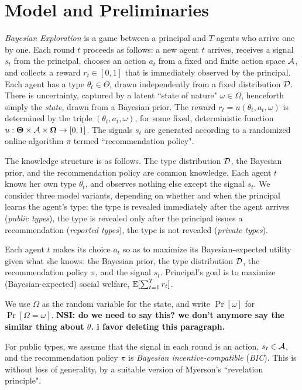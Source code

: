 \section{Model and Preliminaries}

\emph{Bayesian Exploration} is a game between a principal and $T$ agents who arrive one by one. Each round $t$ proceeds as follows: a new agent $t$ arrives, receives a signal $s_t$ from the principal, chooses an action $a_t$ from a fixed and finite action space $\mathcal{A}$, and collects a reward $r_t\in [0,1]$ that is immediately observed by the principal. Each agent has a type $\theta_t\in\varTheta$, drawn independently from a fixed distribution $\mathcal{D}$. There is uncertainty, captured by a latent ``state of nature" $\omega\in \varOmega$, henceforth simply the \emph{state}, drawn from a Bayesian prior. The reward $r_t = u(\theta_t,a_t,\omega)$ is determined by the triple $(\theta_t,a_t,\omega)$, for some fixed, deterministic function
    $u:\bold{\Theta}\times \mathcal{A} \times \bold{\Omega} \to [0,1]$.
The signals $s_t$ are generated according to a randomized online algorithm $\pi$ termed ``recommendation policy".

The knowledge structure is as follows. The type distribution $\mathcal{D}$, the Bayesian prior, and the recommendation policy are common knowledge. Each agent $t$ knows her own type $\theta_t$, and observes nothing else except the signal $s_t$.  We consider three model variants, depending on whether and when the principal learns the agent's type: the type is revealed immediately after the agent arrives (\emph{public types}), the type is revealed only after the principal issues a recommendation (\emph{reported types}), the type is not revealed (\emph{private types}).


Each agent $t$ makes its choice $a_t$ so as to maximize its Bayesian-expected utility given what she knows: the Bayesian prior, the type distribution $\mathcal{D}$, the recommendation policy $\pi$, and the signal $s_t$. Principal's goal is to maximize (Bayesian-expected) social welfare, \ie $\mathbb{E}[\sum_{t=1}^T r_t]$. 

We use $\Omega$ as the random variable for the state, and write $\Pr[\omega]$ for $\Pr[\Omega=\omega]$. {\bf NSI: do we need to say this? we don't anymore say the similar thing about $\theta$.  i favor deleting this paragraph.}

For public types, we assume that the signal in each round is an action, \ie $s_t \in \mathcal{A}$, and the recommendation policy $\pi$ is {\em Bayesian incentive-compatible} (\emph{BIC}). This is without loss of generality, by a suitable version of Myerson's ``revelation principle".

